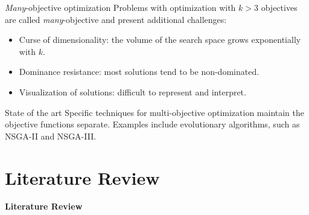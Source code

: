 \documentclass[aspectratio=169,xcolor=dvipsnames]{beamer}
\begin{document}
\begin{frame}{\textit{Many}-objective optimization}
    Problems with optimization with $k > 3$ objectives are called \textit{many}-objective and present additional challenges:
    \begin{itemize}
        \item Curse of dimensionality: the volume of the search space grows exponentially with $k$.
        \item Dominance resistance: most solutions tend to be non-dominated.
        \item Visualization of solutions: difficult to represent and interpret.
    \end{itemize}

    \vspace{1em}
    \begin{block}{State of the art}
        Specific techniques for multi-objective optimization maintain the objective functions separate. Examples include evolutionary algorithms, such as \alert{NSGA-II} and \alert{NSGA-III}.
    \end{block}
\end{frame}








\section{Literature Review}

\begin{frame}  %
    \Large{\centerline{\textbf{Literature Review}}}
\end{frame}
\end{document}

